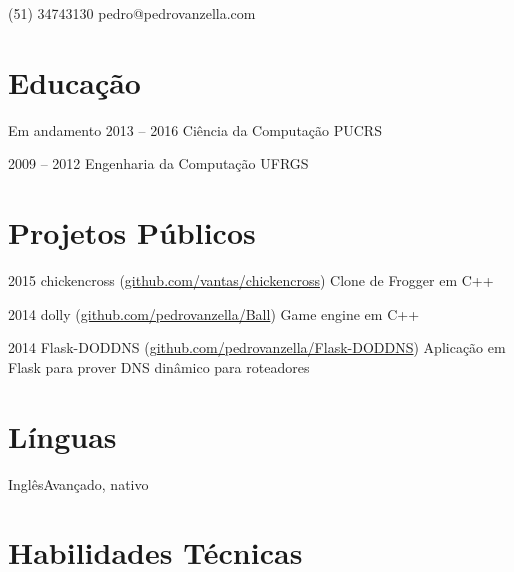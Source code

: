 \documentclass{tccv}
\begin{document}
    {(51) 34743130}
    {pedro@pedrovanzella.com}

\section{Educação}

\begin{yearlist}

\item[Em andamento]{2013 -- 2016}
     {Ciência da Computação}
     {PUCRS}

\item{2009 -- 2012}
     {Engenharia da Computação}
     {UFRGS}

\end{yearlist}

\section{Projetos Públicos}

\begin{yearlist}
  
\item{2015}
     {chickencross (\href{https://github.com/vantas/chickencross}{github.com/vantas/chickencross})}
     {Clone de Frogger em C++}

\item{2014}
     {dolly (\href{https://github.com/pedrovanzella/Ball}{github.com/pedrovanzella/Ball})}
     {Game engine em C++}

\item{2014}
     {Flask-DODDNS (\href{https://github.com/pedrovanzella/Flask-DODDNS}{github.com/pedrovanzella/Flask-DODDNS})}
     {Aplicação em Flask para prover DNS dinâmico para roteadores}

\end{yearlist}

\section{Línguas}

\begin{factlist}
\item{Inglês}{Avançado, nativo}
\end{factlist}

\section{Habilidades Técnicas}
\end{document}

